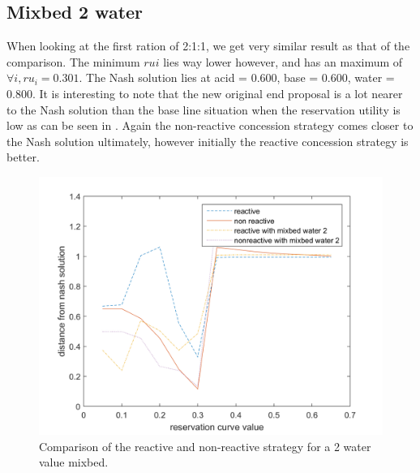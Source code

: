\subsection{Mixbed 2 water}
When looking at the first ration of 2:1:1, we get very similar result as that of the comparison. The minimum $rui$ lies way lower however, and has an maximum of $\forall i, ru_i = 0.301$. The Nash solution lies at acid = 0.600, base = 0.600, water = 0.800.
It is interesting to note that the new original end proposal is a lot nearer to the Nash solution than the base line situation when the reservation utility is low as can be seen in . Again the non-reactive concession strategy comes closer to the Nash solution ultimately, however initially the reactive concession strategy is better. 
\begin{figure}[h]
	\centering
	\includegraphics[width=0.7\linewidth]{img/reactivevsnonreactivemixbed2.png}
	\caption{Comparison of the reactive and non-reactive strategy for a 2 water value mixbed.}
	\label{fig:reactivevsnon-reactivemixbed2}
\end{figure}


